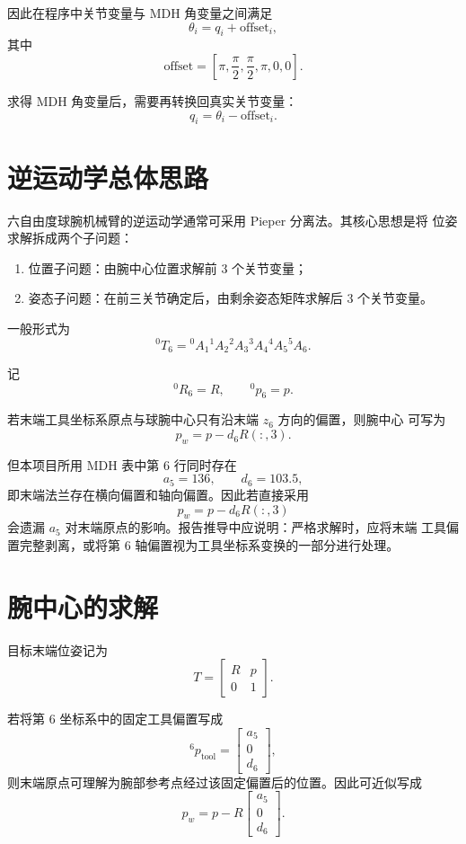 \documentclass[UTF8,a4paper,12pt]{ctexart}
\begin{document}
因此在程序中关节变量与 MDH 角变量之间满足
\[
\theta_i=q_i+\mathrm{offset}_i,
\]
其中
\[
\mathrm{offset}
=
\left[
\pi,\frac{\pi}{2},\frac{\pi}{2},\pi,0,0
\right].
\]

求得 MDH 角变量后，需要再转换回真实关节变量：
\[
q_i=\theta_i-\mathrm{offset}_i.
\]

\section{逆运动学总体思路}

六自由度球腕机械臂的逆运动学通常可采用 Pieper 分离法。其核心思想是将
位姿求解拆成两个子问题：

\begin{enumerate}
    \item 位置子问题：由腕中心位置求解前 3 个关节变量；
    \item 姿态子问题：在前三关节确定后，由剩余姿态矩阵求解后 3 个关节变量。
\end{enumerate}

一般形式为
\[
{}^{0}T_6
={}^0A_1{}^1A_2{}^2A_3{}^3A_4{}^4A_5{}^5A_6.
\]

记
\[
{}^0R_6=R,\qquad {}^0p_6=p.
\]

若末端工具坐标系原点与球腕中心只有沿末端 $z_6$ 方向的偏置，则腕中心
可写为
\[
p_w=p-d_6R(:,3).
\]

但本项目所用 MDH 表中第 6 行同时存在
\[
a_5=136,\qquad d_6=103.5,
\]
即末端法兰存在横向偏置和轴向偏置。因此若直接采用
\[
p_w=p-d_6R(:,3)
\]
会遗漏 $a_5$ 对末端原点的影响。报告推导中应说明：严格求解时，应将末端
工具偏置完整剥离，或将第 6 轴偏置视为工具坐标系变换的一部分进行处理。

\section{腕中心的求解}

目标末端位姿记为
\[
T=
\begin{bmatrix}
R&p\\
0&1
\end{bmatrix}.
\]

若将第 6 坐标系中的固定工具偏置写成
\[
{}^6p_{\mathrm{tool}}
=
\begin{bmatrix}
a_5\\0\\d_6
\end{bmatrix},
\]
则末端原点可理解为腕部参考点经过该固定偏置后的位置。因此可近似写成
\[
p_w=p-R
\begin{bmatrix}
a_5\\0\\d_6
\end{bmatrix}.
\]
\end{document}
